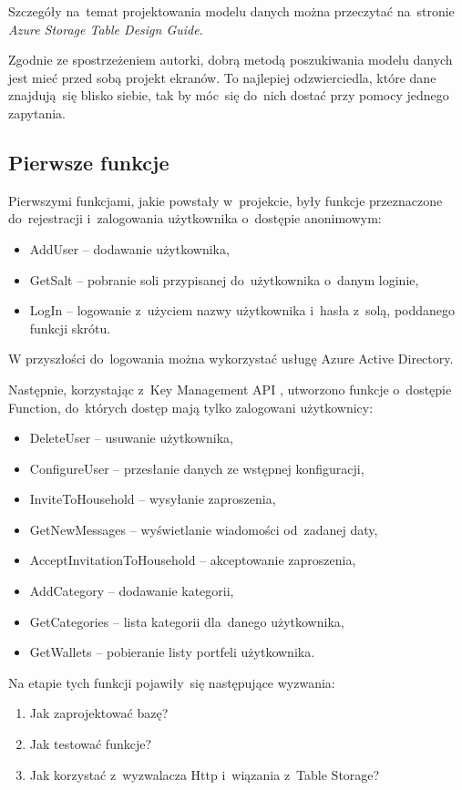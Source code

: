 \documentclass[12pt,a4paper,twoside,titlepage,openright]{book}
\begin{document}
Szczegóły na~temat projektowania modelu danych można przeczytać na~stronie \textit{Azure Storage Table Design Guide}.\cite{siteAppTableDeisgnGuide}

Zgodnie ze spostrzeżeniem autorki, dobrą metodą poszukiwania modelu danych jest mieć przed sobą projekt ekranów. To najlepiej odzwierciedla, które dane znajdują~się blisko siebie, tak by móc~się do~nich dostać przy pomocy jednego zapytania.



\subsection{Pierwsze funkcje}

Pierwszymi funkcjami, jakie powstały w~projekcie, były funkcje przeznaczone do~rejestracji i~zalogowania użytkownika o~dostępie anonimowym:
\begin{itemize}
\item AddUser -- dodawanie użytkownika,
\item GetSalt -- pobranie soli przypisanej do~użytkownika o~danym loginie,
\item LogIn -- logowanie z~użyciem nazwy użytkownika i~hasła z~solą, poddanego funkcji skrótu.
\end{itemize}
W przyszłości do~logowania można wykorzystać usługę Azure Active Directory. 

Następnie, korzystając z~Key Management API \cite{siteAppKeyManagementApi}, utworzono funkcje o~dostępie Function, do~których dostęp mają tylko zalogowani użytkownicy:
\begin{itemize}
\item DeleteUser -- usuwanie użytkownika,
\item ConfigureUser -- przesłanie danych ze wstępnej konfiguracji,
\item InviteToHousehold -- wysyłanie zaproszenia,
\item GetNewMessages -- wyświetlanie wiadomości od~zadanej daty,
\item AcceptInvitationToHousehold -- akceptowanie zaproszenia,
\item AddCategory -- dodawanie kategorii,
\item GetCategories -- lista kategorii dla~danego użytkownika,
\item GetWallets -- pobieranie listy portfeli użytkownika.
\end{itemize}

Na etapie tych funkcji pojawiły~się następujące wyzwania:
\begin{enumerate}
\item Jak zaprojektować bazę? 
\item Jak testować funkcje?
\item Jak korzystać z~wyzwalacza Http i~wiązania z~Table Storage?
\end{enumerate}
\end{document}
